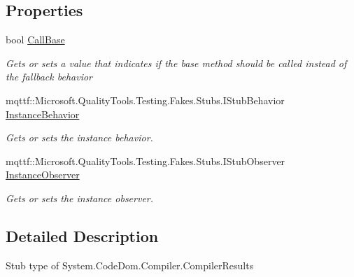 \subsection*{Properties}
\begin{DoxyCompactItemize}
\item 
bool \hyperlink{class_system_1_1_code_dom_1_1_compiler_1_1_fakes_1_1_stub_compiler_results_a89004523f5ec48956636db6d31825822}{Call\-Base}
\begin{DoxyCompactList}\small\item\em Gets or sets a value that indicates if the base method should be called instead of the fallback behavior\end{DoxyCompactList}\item 
mqttf\-::\-Microsoft.\-Quality\-Tools.\-Testing.\-Fakes.\-Stubs.\-I\-Stub\-Behavior \hyperlink{class_system_1_1_code_dom_1_1_compiler_1_1_fakes_1_1_stub_compiler_results_a648b8b5069246fc80c2c4a2948f5c270}{Instance\-Behavior}
\begin{DoxyCompactList}\small\item\em Gets or sets the instance behavior.\end{DoxyCompactList}\item 
mqttf\-::\-Microsoft.\-Quality\-Tools.\-Testing.\-Fakes.\-Stubs.\-I\-Stub\-Observer \hyperlink{class_system_1_1_code_dom_1_1_compiler_1_1_fakes_1_1_stub_compiler_results_a9ed8b96dc9893baeaad46d77691d1517}{Instance\-Observer}
\begin{DoxyCompactList}\small\item\em Gets or sets the instance observer.\end{DoxyCompactList}\end{DoxyCompactItemize}


\subsection{Detailed Description}
Stub type of System.\-Code\-Dom.\-Compiler.\-Compiler\-Results



